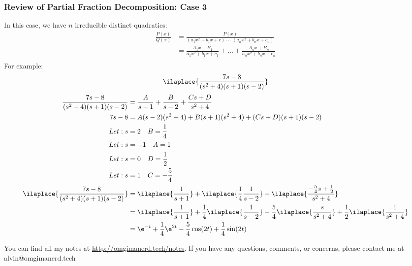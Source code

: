 \documentclass{math}
\begin{document}
\subsubsection*{Review of Partial Fraction Decomposition: Case 3}
In this case, we have \( n \) irreducible distinct quadratics:
\begin{align*}
  \frac{P(x)}{Q(x)} &=
    \frac{P(x)}{(a_1x^2+b_1x+c)\cdot\cdot\cdot(a_nx^2+b_nx+c_n)} \\
  &= \frac{A_1x+B_1}{a_1x^2+b_1x+c_1}+\dots+\frac{A_nx+B_n}{a_nx^2+b_nx+c_n} \\
\end{align*}
For example:
\[ \ilaplace{\frac{7s-8}{(s^2+4)(s+1)(s-2)}} \]
\begin{align*}
  \frac{7s-8}{(s^2+4)(s+1)(s-2)} &=
    \frac{A}{s-1}+\frac{B}{s-2}+\frac{Cs+D}{s^2+4} \\
  7s-8 &= A(s-2)(s^2+4)+B(s+1)(s^2+4)+(Cs+D)(s+1)(s-2) \\
  Let: s &= 2 \quad B = \frac{1}{4} \\
  Let: s &= -1 \quad A = 1 \\
  Let: s &= 0 \quad D = \frac{1}{2} \\
  Let: s &= 1 \quad C = -\frac{5}{4} \\
  \ilaplace{\frac{7s-8}{(s^2+4)(s+1)(s-2)}} &= \ilaplace{\frac{1}{s+1}}+
    \ilaplace{\frac{1}{4}\frac{1}{s-2}}+
    \ilaplace{\frac{-\frac{5}{4}s+\frac{1}{2}}{s^2+4}} \\
  &= \ilaplace{\frac{1}{s+1}}+\frac{1}{4}\ilaplace{\frac{1}{s-2}}-
    \frac{5}{4}\ilaplace{\frac{s}{s^2+4}}+
    \frac{1}{2}\ilaplace{\frac{1}{s^2+4}} \\
  &= \e^{-t}+\frac{1}{4}\e^{2t}-\frac{5}{4}\cos(2t)+\frac{1}{4}\sin(2t)
\end{align*}


\begin{center}
  You can find all my notes at \url{http://omgimanerd.tech/notes}. If you have
  any questions, comments, or concerns, please contact me at
  alvin@omgimanerd.tech
\end{center}
\end{document}
